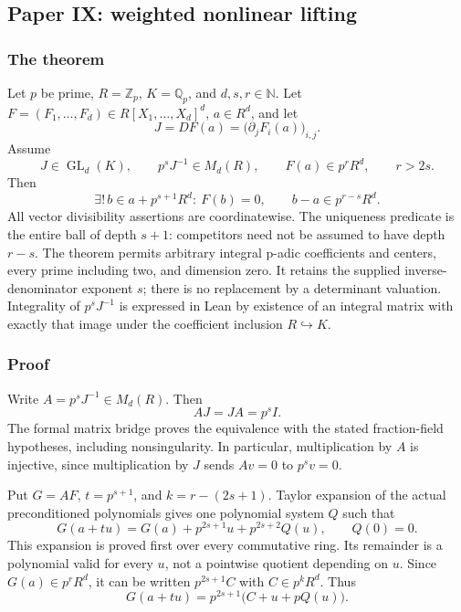 \hypertarget{cont6:paper-ix-weighted-nonlinear-lifting}{%
\subsection{Paper IX: weighted nonlinear
lifting}\label{cont6:paper-ix-weighted-nonlinear-lifting}}

\hypertarget{cont6:the-theorem}{%
\subsubsection{The theorem}\label{cont6:the-theorem}}

Let \(p\) be prime, \(R=\mathbb Z_p\), \(K=\mathbb Q_p\), and
\(d,s,r\in\mathbb N\). Let
\(F=(F_1,\ldots,F_d)\in R[X_1,\ldots,X_d]^d\), \(a\in R^d\), and let \[
J=DF(a)=\bigl(\partial_jF_i(a)\bigr)_{i,j}.
\] Assume \[
J\in\operatorname{GL}_d(K),\qquad p^sJ^{-1}\in M_d(R),\qquad
F(a)\in p^rR^d,\qquad r>2s.
\] Then \[
\boxed{\exists!\,b\in a+p^{s+1}R^d:\ F(b)=0,}
\qquad
\boxed{b-a\in p^{r-s}R^d.}
\] All vector divisibility assertions are coordinatewise. The uniqueness
predicate is the entire ball of depth \(s+1\): competitors need not be
assumed to have depth \(r-s\). The theorem permits arbitrary integral
p-adic coefficients and centers, every prime including two, and
dimension zero. It retains the supplied inverse-denominator exponent
\(s\); there is no replacement by a determinant valuation. Integrality
of \(p^sJ^{-1}\) is expressed in Lean by existence of an integral matrix
with exactly that image under the coefficient inclusion
\(R\hookrightarrow K\).

\hypertarget{cont6:proof}{%
\subsubsection{Proof}\label{cont6:proof}}

Write \(A=p^sJ^{-1}\in M_d(R)\). Then \[
AJ=JA=p^sI.
\] The formal matrix bridge proves the equivalence with the stated
fraction-field hypotheses, including nonsingularity. In particular,
multiplication by \(A\) is injective, since multiplication by \(J\)
sends \(Av=0\) to \(p^sv=0\).

Put \(G=AF\), \(t=p^{s+1}\), and \(k=r-(2s+1)\). Taylor expansion of the
actual preconditioned polynomials gives one polynomial system \(Q\) such
that \[
G(a+tu)=G(a)+p^{2s+1}u+p^{2s+2}Q(u),\qquad Q(0)=0.
\] This expansion is proved first over every commutative ring. Its
remainder is a polynomial valid for every \(u\), not a pointwise
quotient depending on \(u\). Since \(G(a)\in p^rR^d\), it can be written
\(p^{2s+1}C\) with \(C\in p^kR^d\). Thus \[
G(a+tu)=p^{2s+1}\bigl(C+u+pQ(u)\bigr).
\]

